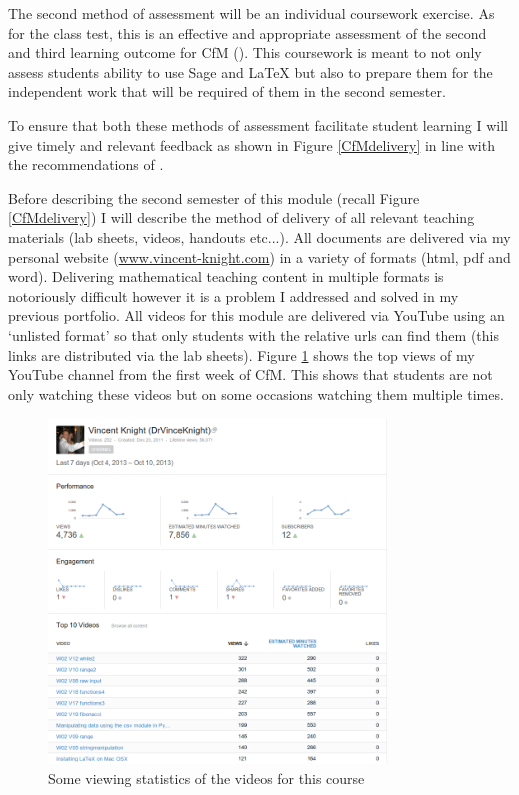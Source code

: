 \documentclass{article}
\begin{document}
The second method of assessment will be an individual coursework exercise. As for the class test, this is an effective and appropriate assessment of the second and third learning outcome for CfM (\cite{chamillard_evaluating_2000}). This coursework is meant to not only assess students ability to use Sage and LaTeX but also to prepare them for the independent work that will be required of them in the second semester.

To ensure that both these methods of assessment facilitate student learning I will give timely and relevant feedback as shown in Figure \ref{CfMdelivery} in line with the recommendations of \cite{gibbs_conditions_2004}.

Before describing the second semester of this module (recall Figure \ref{CfMdelivery}) I will describe the method of delivery of all relevant teaching materials (lab sheets, videos, handouts etc...). All documents are delivered via my personal website (\url{www.vincent-knight.com}) in a variety of formats (html, pdf and word). Delivering mathematical teaching content in multiple formats is notoriously difficult however it is a problem I addressed and solved in my previous portfolio. All videos for this module are delivered via YouTube using an `unlisted format' so that only students with the relative urls can find them (this links are distributed via the lab sheets). Figure \ref{videoviews} shows the top views of my YouTube channel from the first week of CfM. This shows that students are not only watching these videos but on some occasions watching them multiple times.

\begin{figure}[htdp]
\begin{center}
\includegraphics[width=9cm]{./Images/videoviews.png}
\end{center}
\caption{Some viewing statistics of the videos for this course}\label{videoviews}
\end{figure}
\end{document}

